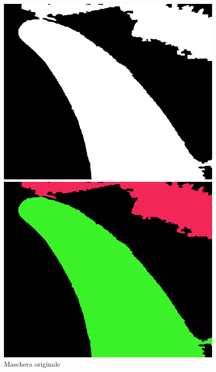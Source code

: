 \documentclass[a4paper,12pt]{report}
\begin{document}
      \begin{figure}[H]
        \centering
        \begin{minipage}{0.3\textwidth}
          \centering
          \includegraphics[width=\textwidth]{assets/images/alg_area/original.png}   
          \caption{Maschera originale}
        \end{minipage}
        \begin{minipage}{0.3\textwidth}
          \centering
          \includegraphics[width=\textwidth]{assets/images/alg_area/find.png}  

\end{minipage}
\end{figure}
\end{document}
